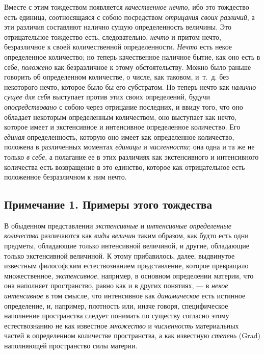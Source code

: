{Вместе с этим тождеством появляется {\em качественное
нечто}, ибо это тождество есть единица, соотносящаяся с собою посредством
{\em отрицания своих различий}, а эти различия
составляют налично сущую определенность величины. Это отрицательное
тождество есть, следовательно, {\em нечто} и притом
нечто, безразличное к своей количественной определенности.
{\em Нечто} есть некое определенное количество; но
теперь качественное наличное бытие, как оно есть в себе,
{\em положено} как безразличное к этому обстоятельству.
Можно было раньше говорить об определенном количестве, о числе, как
таковом, и~т.~д. без некоторого нечто, которое было бы его субстратом. Но
теперь нечто как {\em налично-сущее для себя} выступает
против этих своих определений, будучи
{\em опосредствовано} с собою через отрицание
последних, и ввиду того, что оно обладает некоторым определенным
количеством, оно выступает как нечто, которое имеет и экстенсивное и
интенсивное определенное количество. Его {\em единая}
определенность, которую оно имеет как определенное количество, положена в
различенных моментах {\em единицы} и
{\em численности}; она одна и та же не только
{\em в себе}, а полагание ее в этих различиях как
экстенсивного и интенсивного количества есть возвращение в это единство,
которое как отрицательное есть положенное безразличном к ним нечто.

\subsection*{Примечание 1. Примеры этого тождества}

В обыденном представлении {\em экстенсивные} и
{\em интенсивные определенные количества} различаются
как {\em виды величин} таким образом, как будто есть
одни предметы, обладающие только интенсивной величиной, и другие,
обладающие только экстенсивной величиной. К этому прибавилось, далее,
выдвинутое известным философским естествознанием представление, которое
превращало множественное, {\em экстенсивное}, например,
в основном определении материи, что она наполняет пространство, равно как и
в других понятиях, — в {\em некое интенсивное} в том
смысле, что интенсивное как {\em динамическое} есть
истинное определение, и, например, плотность или, иначе говоря,
специфическое наполнение пространства следует понимать по существу согласно
этому естествознанию не как известное {\em множество} и
{\em численность} материальных частей в определенном
количестве пространства, а как известную {\em степень}
(Grad) наполняющей пространство силы материи.

}
